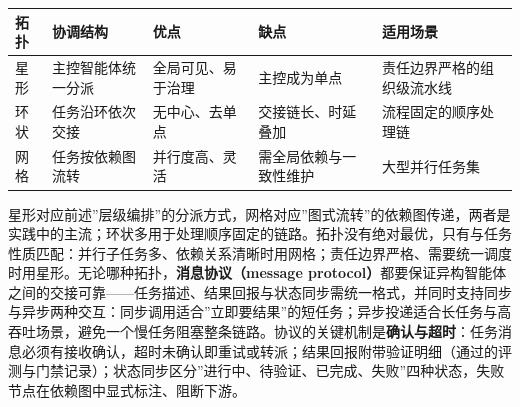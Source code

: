 \documentclass[12pt,a4paper,twoside,openany]{ctexbook}
\numberwithin{figure}{chapter}
\numberwithin{table}{chapter}
\newcounter{none}
\begin{document}
{\def\LTcaptype{none} %
\begin{longtable}[]{@{}
  >{\raggedright\arraybackslash}p{}
  >{\raggedright\arraybackslash}p{}
  >{\raggedright\arraybackslash}p{}
  >{\raggedright\arraybackslash}p{}
  >{\raggedright\arraybackslash}p{}@{}}
\toprule\noalign{}
\begin{minipage}[b]{\linewidth}\raggedright
拓扑
\end{minipage} & \begin{minipage}[b]{\linewidth}\raggedright
协调结构
\end{minipage} & \begin{minipage}[b]{\linewidth}\raggedright
优点
\end{minipage} & \begin{minipage}[b]{\linewidth}\raggedright
缺点
\end{minipage} & \begin{minipage}[b]{\linewidth}\raggedright
适用场景
\end{minipage} \\
\midrule\noalign{}
\endhead
\bottomrule\noalign{}
\endlastfoot
星形 & 主控智能体统一分派 & 全局可见、易于治理 & 主控成为单点 &
责任边界严格的组织级流水线 \\
环状 & 任务沿环依次交接 & 无中心、去单点 & 交接链长、时延叠加 &
流程固定的顺序处理链 \\
网格 & 任务按依赖图流转 & 并行度高、灵活 & 需全局依赖与一致性维护 &
大型并行任务集 \\
\end{longtable}
}

星形对应前述''层级编排''的分派方式，网格对应''图式流转''的依赖图传递，两者是实践中的主流；环状多用于处理顺序固定的链路。拓扑没有绝对最优，只有与任务性质匹配：并行子任务多、依赖关系清晰时用网格；责任边界严格、需要统一调度时用星形。无论哪种拓扑，\textbf{消息协议（message
protocol）}都要保证异构智能体之间的交接可靠------任务描述、结果回报与状态同步需统一格式，并同时支持同步与异步两种交互：同步调用适合''立即要结果''的短任务；异步投递适合长任务与高吞吐场景，避免一个慢任务阻塞整条链路。协议的关键机制是\textbf{确认与超时}：任务消息必须有接收确认，超时未确认即重试或转派；结果回报附带验证明细（通过的评测与门禁记录）；状态同步区分''进行中、待验证、已完成、失败''四种状态，失败节点在依赖图中显式标注、阻断下游。
\end{document}
